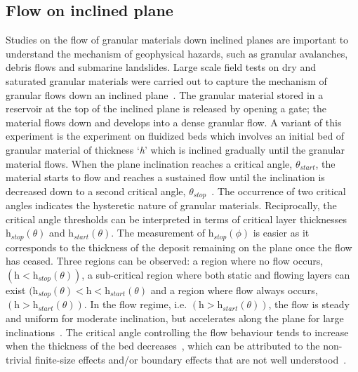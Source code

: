 \subsection{Flow on inclined plane}
Studies on the flow of granular materials down inclined planes are important to 
understand the mechanism of geophysical hazards, such as granular avalanches, 
debris flows and submarine landslides. Large scale field tests on dry and 
saturated granular materials were carried out to capture the mechanism of 
granular flows down an inclined plane~\citep{Okada2008,Denlinger2001}. The 
granular material stored in a reservoir at the top of the inclined plane is 
released by opening a gate; the material flows down and develops into a dense 
granular flow. A variant of this experiment is the experiment on fluidized beds 
which involves an initial bed of granular material of thickness `\textit{h}' 
which is inclined gradually until the granular material flows. When the plane 
inclination reaches a critical angle, $\theta_{\textit{start}}$, the material 
starts to flow and reaches a sustained flow until the inclination is decreased 
down to a second critical angle, $\theta_{\textit{stop}}$~\citep{Midi2004}. The 
occurrence of two critical angles indicates the hysteretic nature of granular 
materials. Reciprocally, the critical angle thresholds can be interpreted in 
terms of critical layer thicknesses $\textit{h}_{\textit{stop}}(\theta)$ and 
$\textit{h}_{\textit{start}}(\theta)$. The measurement of  
$\textit{h}_{\textit{stop}}(\phi)$ is easier as it corresponds to the thickness 
of the deposit remaining on the plane once the flow has ceased. Three regions 
can be observed: a region where no flow occurs, 
$(\textit{h}<\textit{h}_{\textit{stop}}(\theta))$, a sub-critical region where 
both static and flowing layers can exist $(\textit{h}_{\textit{stop}}(\theta) < 
\textit{h} < \textit{h}_{\textit{start}}(\theta)$ and a region where flow 
always occurs, $(\textit{h}>\textit{h}_{\textit{start}}(\theta))$. In the flow 
regime, i.e. $(\textit{h}>\textit{h}_{\textit{start}}(\theta))$, the flow is 
steady and uniform for moderate inclination, but accelerates along the plane 
for large inclinations~\citep{Midi2004}. The critical angle controlling the 
flow behaviour tends to increase when the thickness of the bed 
decreases~\citep{Pouliquen2002a,Daerr1999}, which can be attributed to the 
non-trivial finite-size effects and/or boundary effects that are not well 
understood~\citep{Forterre2008}. 

